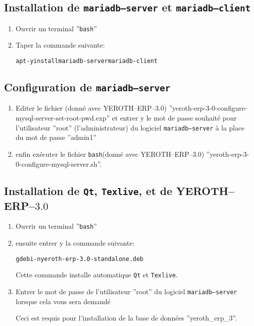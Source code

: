 \documentclass[a4paper, 10pt]{article}
\newcommand{\texlive}{\texttt{Texlive}\xspace}
\newcommand{\bash}{\texttt{bash}\xspace}
\newcommand{\qt}{\texttt{Qt}\xspace}
\newcommand{\mariadbserver}{\texttt{mariadb--server}\xspace}
\newcommand{\mariadbclient}{\texttt{mariadb--client}\xspace}
\newcommand{\yerotherptroiszero}{\textcolor{yerenColorBlue}{\sc YEROTH--ERP--$3.0$}\xspace}
\newcommand{\rootcommand}[1]{
\begin{center}
\textcolor{purplish}{#1\xspace}
\end{center}}
\begin{document}
\subsection{Installation de \mariadbserver et \mariadbclient}

\begin{enumerate}[1)]
	\item Ouvrir un terminal ''\bash''
	\item Taper la commande suivante:
		\begin{alltt}
			\rootcommand{apt -y install mariadb-server mariadb-client}
		\end{alltt}		
\end{enumerate} 

\subsection{Configuration de \mariadbserver}

\begin{enumerate}[1)]
	\item Editer le fichier (donn\'e avec \yerotherptroiszero)
		''yeroth-erp-3-0-configure-mysql-server-set-root-pwd.exp''
		et entrer y le mot de passe souhait\'e pour
		l'utilisateur ''root'' (l'administrateur) du logiciel \mariadbserver
		\`a la place du mot de passe ''admin1''
		
	\item enfin ex\'ecuter le fichier \bash (donn\'e avec \yerotherptroiszero)
		''yeroth-erp-3-0-configure-mysql-server.sh''.\\	
\end{enumerate}

\subsection{Installation de \qt, \texlive, et de \yerotherptroiszero}

\begin{enumerate}[1)]
	\item Ouvrir un terminal ''\bash''
	\item ensuite entrer y la commande suivante:
		\begin{alltt}
			\rootcommand{gdebi -n yeroth-erp-3.0-standalone.deb}
		\end{alltt}
		
		Cette commande installe automatique \qt et \texlive.
		
	\item Entrer le mot de passe de l'utilisateur ''root''
		du logiciel \mariadbserver lorsque cela vous
		sera demand\'e
		
		Ceci est requis pour l'installation de la base
		de donn\'ees ''yeroth\_erp\_3''.\\
\end{enumerate}
\end{document}
